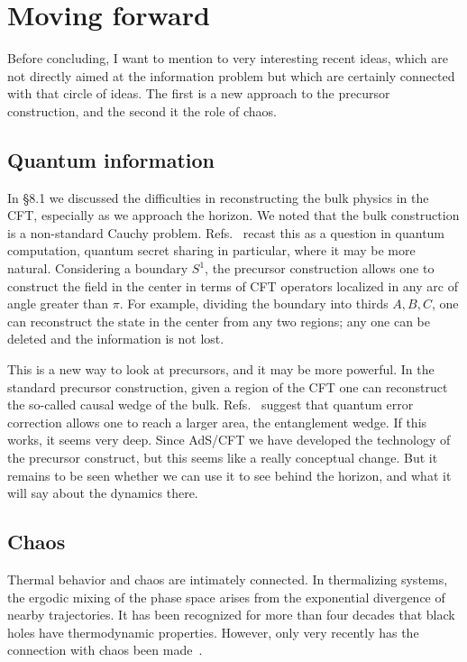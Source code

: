 \documentclass[12pt]{article}
\begin{document}
\section{Moving forward}

Before concluding, I want to mention to very interesting recent ideas, which are not directly aimed at the information problem but which are certainly connected with that circle of ideas.  The first is a new approach to the precursor construction, and the second it the role of chaos. 

\subsection{Quantum information}

In \S8.1 we discussed the difficulties in reconstructing the bulk physics in the CFT, especially as we approach the horizon.  We noted that the bulk construction is a non-standard Cauchy problem.  Refs.~\cite{Almheiri:2014lwa,Pastawski:2015qua} recast this as a question in quantum computation, quantum secret sharing in particular, where it may be more natural.
Considering a boundary $S^1$, the precursor construction allows one to construct the field in the center in terms of CFT operators localized in any arc of angle greater than $\pi$.  For example, dividing the boundary into thirds $A,B,C$, one can reconstruct the state in the center from any two regions; any one can be deleted and the information is not lost.

This is a new way to look at precursors, and it may be more powerful.
In the standard precursor construction, given a region of the CFT one can reconstruct the so-called causal wedge of the bulk.  Refs.~\cite{Almheiri:2014lwa,Pastawski:2015qua,Jafferis:2015del,Dong:2016eik,Harlow:2016vwg} suggest that quantum error correction allows one to reach a larger area, the entanglement wedge.  If this works, it seems very deep.  Since AdS/CFT we have developed the technology of the precursor construct, but this seems like a really conceptual change.  But it remains to be seen whether we can use it to see behind the horizon, and what it will say about the dynamics there.


\subsection{Chaos}


Thermal behavior and chaos are intimately connected. In thermalizing systems, the ergodic mixing of the phase space arises from the exponential divergence of nearby trajectories.  It has been recognized for more than four decades that black holes have thermodynamic properties. However, only very recently has the connection with chaos been made~\cite{Shenker:2013pqa,Shenker:2014cwa,kitaev,Maldacena:2015waa}.   
\end{document}
